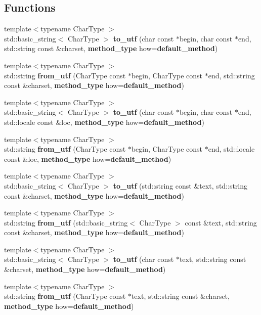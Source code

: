 \subsection*{Functions}
\begin{DoxyCompactItemize}
\item 
{\footnotesize template$<$typename Char\+Type $>$ }\\std\+::basic\+\_\+string$<$ Char\+Type $>$ {\bf to\+\_\+utf} (char const $\ast$begin, char const $\ast$end, std\+::string const \&charset, {\bf method\+\_\+type} how={\bf default\+\_\+method})
\item 
{\footnotesize template$<$typename Char\+Type $>$ }\\std\+::string {\bf from\+\_\+utf} (Char\+Type const $\ast$begin, Char\+Type const $\ast$end, std\+::string const \&charset, {\bf method\+\_\+type} how={\bf default\+\_\+method})
\item 
{\footnotesize template$<$typename Char\+Type $>$ }\\std\+::basic\+\_\+string$<$ Char\+Type $>$ {\bf to\+\_\+utf} (char const $\ast$begin, char const $\ast$end, std\+::locale const \&loc, {\bf method\+\_\+type} how={\bf default\+\_\+method})
\item 
{\footnotesize template$<$typename Char\+Type $>$ }\\std\+::string {\bf from\+\_\+utf} (Char\+Type const $\ast$begin, Char\+Type const $\ast$end, std\+::locale const \&loc, {\bf method\+\_\+type} how={\bf default\+\_\+method})
\item 
{\footnotesize template$<$typename Char\+Type $>$ }\\std\+::basic\+\_\+string$<$ Char\+Type $>$ {\bf to\+\_\+utf} (std\+::string const \&text, std\+::string const \&charset, {\bf method\+\_\+type} how={\bf default\+\_\+method})
\item 
{\footnotesize template$<$typename Char\+Type $>$ }\\std\+::string {\bf from\+\_\+utf} (std\+::basic\+\_\+string$<$ Char\+Type $>$ const \&text, std\+::string const \&charset, {\bf method\+\_\+type} how={\bf default\+\_\+method})
\item 
{\footnotesize template$<$typename Char\+Type $>$ }\\std\+::basic\+\_\+string$<$ Char\+Type $>$ {\bf to\+\_\+utf} (char const $\ast$text, std\+::string const \&charset, {\bf method\+\_\+type} how={\bf default\+\_\+method})
\item 
{\footnotesize template$<$typename Char\+Type $>$ }\\std\+::string {\bf from\+\_\+utf} (Char\+Type const $\ast$text, std\+::string const \&charset, {\bf method\+\_\+type} how={\bf default\+\_\+method})

\end{DoxyCompactItemize}
